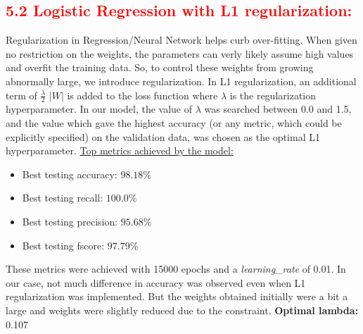\documentclass[a4paper,10pt,twocolumn]{article}
\begin{document}
\subsection*{\textcolor{red}{5.2 Logistic Regression with L1 regularization:}}
Regularization in Regression/Neural Network helps curb over-fitting. When given no restriction on the weights, the parameters can verly likely assume high values and overfit the training data. So, to control these weights from growing abnormally large, we introduce regularization. In L1 regularization, an additional term of $\frac{\lambda}{2}$ $|W|$ is added to the loss function where $\lambda$ is the regularization hyperparameter. In our model, the value of $\lambda$ was searched between 0.0 and 1.5, and the value which gave the highest accuracy (or any metric, which could be explicitly specified) on the validation data, was chosen as the optimal L1 hyperparameter.
\newline
\newline
\underline{Top metrics achieved by the model:}
\begin{itemize}
\item{Best testing accuracy: $98.18\%$}
\item{Best testing recall: $100.0\%$}
\item{Best testing precision: $95.68\%$}
\item{Best testing fscore: $97.79\%$}
\end{itemize}
These metrics were achieved with 15000 epochs and a \textit{learning\_rate} of 0.01. In our case, not much difference in accuracy was observed even when L1 regularization was implemented. But the weights obtained initially were a bit a large and weights were slightly reduced due to the constraint.
\textbf{Optimal lambda:} 0.107
\end{document}
